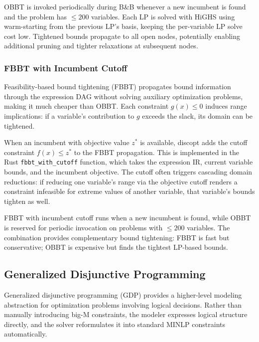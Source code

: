 \documentclass[12pt,preprint]{article}
\begin{document}
OBBT is invoked periodically during B\&B whenever a new incumbent is found and the problem has $\le 200$ variables. Each LP is solved with HiGHS using warm-starting from the previous LP's basis, keeping the per-variable LP solve cost low. Tightened bounds propagate to all open nodes, potentially enabling additional pruning and tighter relaxations at subsequent nodes.

\subsubsection{FBBT with Incumbent Cutoff}
\label{org-fbbt-incumbent-cutoff}
Feasibility-based bound tightening (FBBT) \cite{Belotti2009,Ryoo1996} propagates bound information through the expression DAG without solving auxiliary optimization problems, making it much cheaper than OBBT. Each constraint $g(x) \le 0$ induces range implications: if a variable's contribution to $g$ exceeds the slack, its domain can be tightened.

When an incumbent with objective value $z^*$ is available, discopt adds the cutoff constraint $f(x) \le z^*$ to the FBBT propagation. This is implemented in the Rust \texttt{fbbt\_with\_cutoff} function, which takes the expression IR, current variable bounds, and the incumbent objective. The cutoff often triggers cascading domain reductions: if reducing one variable's range via the objective cutoff renders a constraint infeasible for extreme values of another variable, that variable's bounds tighten as well.

FBBT with incumbent cutoff runs when a new incumbent is found, while OBBT is reserved for periodic invocation on problems with $\le 200$ variables. The combination provides complementary bound tightening: FBBT is fast but conservative; OBBT is expensive but finds the tightest LP-based bounds.

\subsection{Generalized Disjunctive Programming}
\label{sec-gdp}

Generalized disjunctive programming (GDP) \cite{Raman1994,Grossmann2002} provides a higher-level modeling abstraction for optimization problems involving logical decisions. Rather than manually introducing big-M constraints, the modeler expresses logical structure directly, and the solver reformulates it into standard MINLP constraints automatically.
\end{document}
